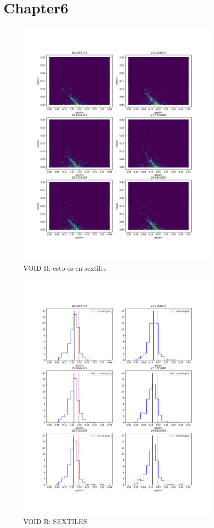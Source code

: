 \chapter*{Chapter6}

\label{PostSemi}


\begin{figure}[h]
\centering
\includegraphics[width=10cm]{Figures/fracciones_R.png}
\decoRule
\caption[asd]{VOID R: esto es en sextiles  }
\label{fig:Electron}
\end{figure}
\begin{figure}[h]
\centering
\includegraphics[width=10cm]{Figures/histogramas_R.png}
\decoRule
\caption[asd]{VOID R: SEXTILES  }
\label{fig:Electron}
\end{figure}

